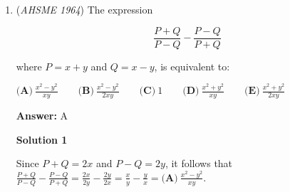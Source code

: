 \begin{enumerate}
 \textbf{Answer: }D



\textbf{Solution 1}

When $x$ is divided by $y$, the quotient is $u$ while the remainder is $v$.  So $x = uy + v$.

 Now $x + 2uy = uy + v + 2uy = 3uy + v$.  Therefore, when $x + 2uy$ is divided by $y$, the quotient is $3u$ while the remainder is $\boxed{\textbf{(D)}\ v }$.

 



\textbf{Solution 2}

Notice that $x + 2uy \equiv v + 0 \equiv \boxed{\textbf{(D)}\ v}\ (\textrm{mod}\ y)$. 

 



\textbf{Solution 3}

If the statement is true for all values of $(x, y, u, v)$, then it must be true for a specific set of $(x, y, u, v)$.

 If you let $x=43$ and $y = 8$, then the quotient is $u = 5$ and the remainder is $v = 3$.  The problem asks what the remainder is when you divide $x + 2uy = 43 + 2 \cdot 5 \cdot 8 = 123$ by $8$.  In this case, the remainder is $3$.

 When you plug in $u=5$ and $v = 3$ into the answer choices, they become $0, 5, 10, 3, 6$, respectively.  Therefore, the answer is $\boxed{\textbf{(D)}\ v}$.

 


	\item (\textit{AHSME 1964}) The expression


 
 \[\frac{P+Q}{P-Q}-\frac{P-Q}{P+Q}\]


 where $P=x+y$ and $Q=x-y$, is equivalent to:


 $\textbf{(A)}\ \frac{x^2-y^2}{xy}\qquad \textbf{(B)}\ \frac{x^2-y^2}{2xy}\qquad \textbf{(C)}\ 1 \qquad \textbf{(D)}\ \frac{x^2+y^2}{xy}\qquad \textbf{(E)}\ \frac{x^2+y^2}{2xy}$

 \textbf{Answer: }A



\textbf{Solution 1}

Since $P+Q = 2x$ and $P - Q = 2y$, it follows that $\frac{P+Q}{P-Q}-\frac{P-Q}{P+Q} = \frac{2x}{2y} - \frac{2y}{2x} = \frac{x}{y} - \frac{y}{x} = \boxed{\textbf{(A)}\ \frac{x^2 - y^2}{xy}}$.

 



\end{enumerate}
